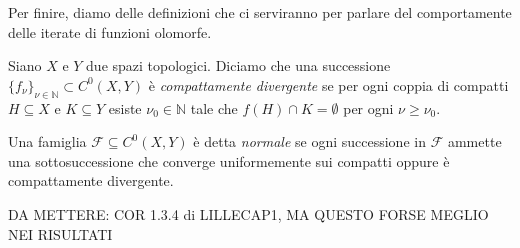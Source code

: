 Per finire, diamo delle definizioni che ci serviranno per parlare del comportamente delle iterate di funzioni olomorfe.

\begin{defn}
    Siano $X$ e $Y$ due spazi topologici. Diciamo che una successione $\{f_{\nu}\}_{\nu \in \mathbb{N}} \subset C^0(X,Y)$ è \textit{compattamente divergente} se per ogni coppia di compatti $H\subseteq X$ e $K\subseteq Y$ esiste $\nu_0 \in \mathbb{N}$ tale che $f(H)\cap K=\emptyset$ per ogni $\nu \ge \nu_0$.

    Una famiglia $\mathcal{F} \subseteq C^0(X,Y)$ è detta \textit{normale} se ogni successione in $\mathcal{F}$ ammette una sottosuccessione che converge uniformemente sui compatti oppure è compattamente divergente.
\end{defn}

DA METTERE: COR 1.3.4 di LILLECAP1, MA QUESTO FORSE MEGLIO NEI RISULTATI